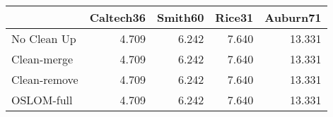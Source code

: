 \begin{tabular}{lrrrr}
\toprule
{} & Caltech36 & Smith60 & Rice31 & Auburn71 \\
\midrule
No Clean Up  &     4.709 &   6.242 &  7.640 &   13.331 \\
Clean-merge  &     4.709 &   6.242 &  7.640 &   13.331 \\
Clean-remove &     4.709 &   6.242 &  7.640 &   13.331 \\
OSLOM-full   &     4.709 &   6.242 &  7.640 &   13.331 \\
\bottomrule
\end{tabular}
